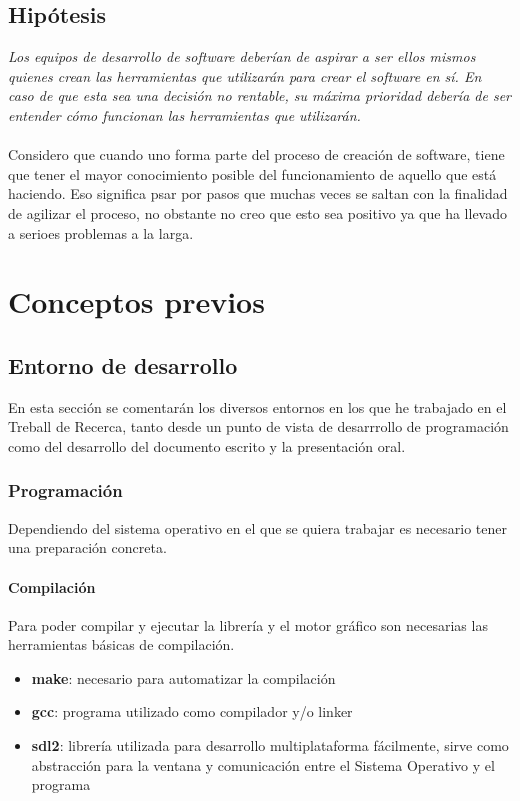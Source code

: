 \documentclass{report}
\begin{document}
\section{Hipótesis}
\textit{Los equipos de desarrollo de software deberían de aspirar a ser ellos mismos quienes crean las herramientas que utilizarán para crear el software en sí. En caso de que esta sea una decisión no rentable, su máxima prioridad debería de ser entender cómo funcionan las herramientas que utilizarán.}
\\\\
Considero que cuando uno forma parte del proceso de creación de software, tiene que tener el mayor conocimiento posible del funcionamiento de aquello que está haciendo. Eso significa psar por pasos que muchas veces se saltan con la finalidad de agilizar el proceso, no obstante no creo que esto sea positivo ya que ha llevado a serioes problemas a la larga.

\newpage

\chapter{Conceptos previos}
\section{Entorno de desarrollo}
En esta sección se comentarán los diversos entornos en los que he trabajado en el Treball de Recerca, tanto desde un punto de vista de desarrrollo de programación como del desarrollo del documento escrito y la presentación oral.
\subsection{Programación}
Dependiendo del sistema operativo en el que se quiera trabajar es necesario tener una preparación concreta.

\subsubsection{Compilación}
Para poder compilar y ejecutar la librería y el motor gráfico son necesarias las herramientas básicas de compilación.
\begin{itemize}
\item{\textbf{make}: necesario para automatizar la compilación}
\item{\textbf{gcc}: programa utilizado como compilador y/o linker}
\item{\textbf{sdl2}: librería utilizada para desarrollo multiplataforma fácilmente, sirve como abstracción para la ventana y comunicación entre el Sistema Operativo y el programa}
\end{itemize}
\end{document}
